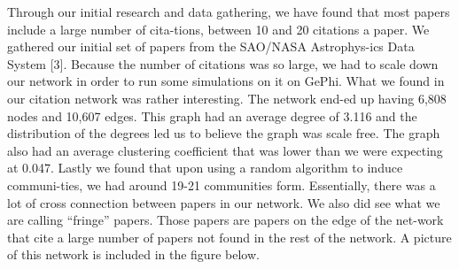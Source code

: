 \documentclass[times, 10pt,twocolumn]{article}
\begin{document}

Through our initial research and data gathering, we have found that most papers include a large number of cita-tions, between 10 and 20 citations a paper. We gathered our initial set of papers from the SAO/NASA Astrophys-ics Data System [3]. Because the number of citations was so large, we had to scale down our network in order to run some simulations on it on GePhi. What we found in our citation network was rather interesting. The network end-ed up having 6,808 nodes and 10,607 edges. This graph had an average degree of 3.116 and the distribution of the degrees led us to believe the graph was scale free. The graph also had an average clustering coefficient that was lower than we were expecting at 0.047. Lastly we found that upon using a random algorithm to induce communi-ties, we had around 19-21 communities form. Essentially, there was a lot of cross connection between papers in our network. We also did see what we are calling “fringe” papers. Those papers are papers on the edge of the net-work that cite a large number of papers not found in the rest of the network. A picture of this network is included in the figure below.
\end{document}
